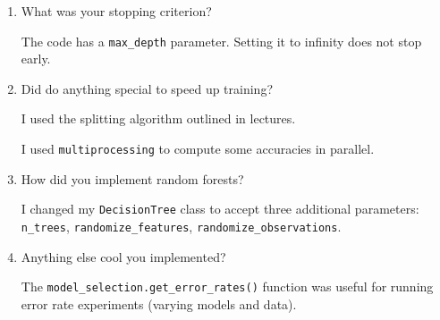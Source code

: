 \documentclass{article}
\begin{document}
\begin{enumerate}
\begin{enumerate}
        \item What was your stopping criterion?
        \begin{mdframed}
          The code has a \texttt{max\_depth} parameter. Setting it to infinity
          does not stop early.
        \end{mdframed}

        \item Did do anything special to speed up training?
        \begin{mdframed}
          I used the splitting algorithm outlined in lectures.

          I used \texttt{multiprocessing} to compute some accuracies in parallel.
        \end{mdframed}

        \item How did you implement random forests?
        \begin{mdframed}
          I changed my \texttt{DecisionTree} class to accept three additional parameters:
          \texttt{n\_trees}, \texttt{randomize\_features}, \texttt{randomize\_observations}.
        \end{mdframed}

        \item Anything else cool you implemented?
        \begin{mdframed}
          The \texttt{model\_selection.get\_error\_rates()} function was useful
          for running error rate experiments (varying models and data).
        \end{mdframed}
    \end{enumerate}


\end{enumerate}
\end{document}

